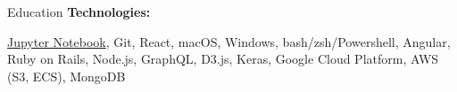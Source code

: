 \documentclass{resume}
\begin{document}
\begin{rSection}{Education}
\vspace{-3pt}
{\bf Technologies:}
\vspace{-1.83em}
\begin{adjustwidth}{7em}{0pt}
    \href{https://github.com/jlucasa?tab=repositories&q=&type=&language=jupyter+notebook&sort=}{Jupyter Notebook},
    Git,
    React,
    macOS,
    Windows,
    bash/zsh/Powershell,
    Angular,
    Ruby on Rails,
    Node.js,
    GraphQL,
    D3.js,
    Keras,
    Google Cloud Platform,
    AWS (S3, ECS),
    MongoDB

\end{adjustwidth}

\end{rSection}

%
%
%
%
%
%
\end{document}
